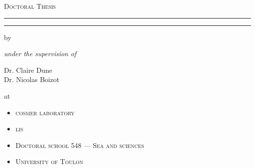 
\thispagestyle{title}

\begin{vplace}

	\begin{center}
		\begin{minipage}[t]{0.75\textwidth}

			\begin{center}

				\textsc{\LARGE Doctoral Thesis}
				\relax{}

				\rule{\textwidth}{1pt}
				\relax{}

				\textbf{\HUGE
					\thetitle{}
				}

				\relax{}

				\rule{\textwidth}{1pt}
				\relax{}

			\end{center}

			by \theauthor{}

			\begin{center}
				\textit{under the supervision of}
			\end{center}

			\begin{flushright}
				Dr. Claire Dune    \\
				Dr. Nicolas Boizot \\
			\end{flushright}
			\relax{}

			at
			\begin{itemize}[topsep=0pt,itemsep=2pt,partopsep=4pt, parsep=0pt]
				\item[]\textsc{\Ac{cosmer} laboratory}
				\item[]\textsc{\Ac{lis}}
				\item[]\textsc{Doctoral school 548 --- Sea and sciences}
				\item[]\textsc{University of Toulon}
			\end{itemize}
			\vspace{1cm}


\end{minipage}
\end{center}
\end{vplace}

